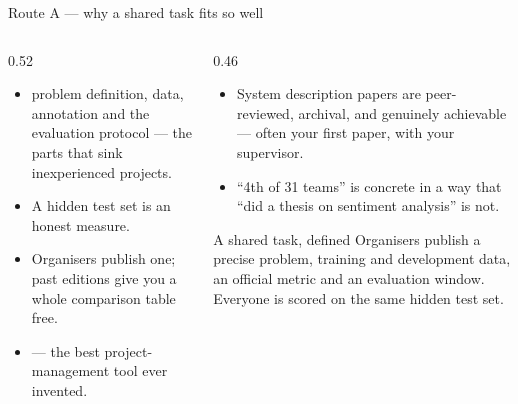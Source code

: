 \documentclass[aspectratio=169,11pt]{beamer}
\begin{document}
\begin{frame}{Route A --- why a shared task fits so well}
\begin{columns}[T]
\begin{column}{0.52\textwidth}
\footnotesize
\begin{itemize}
  \item {} problem definition, data,
        annotation and the evaluation protocol --- the parts that sink
        inexperienced projects.
  \item {} A hidden test set is an honest measure.
  \item {} Organisers publish one; past editions give you a
        whole comparison table free.
  \item {} --- the best project-management tool ever invented.
\end{itemize}
\end{column}
\begin{column}{0.46\textwidth}
\footnotesize
\begin{itemize}
  \item {} System description papers are
        peer-reviewed, archival, and genuinely achievable --- often your first
        paper, with your supervisor.
  \item {} ``4th of 31 teams'' is concrete in a way
        that ``did a thesis on sentiment analysis'' is not.
\end{itemize}
\medskip
\begin{block}{A shared task, defined}
\footnotesize
Organisers publish a precise problem, training and development data, an
official metric and an evaluation window. Everyone is scored on the same hidden
test set.
\end{block}
\end{column}
\end{columns}
\end{frame}
\end{document}
